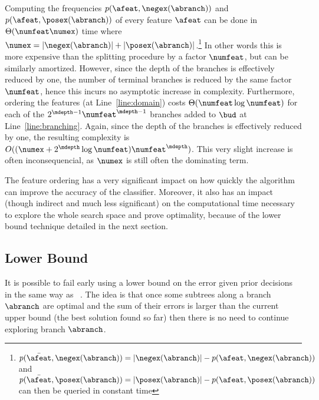 \documentclass{llncs}
\begin{document}


Computing the frequencies $p(\afeat,{\negex(\abranch)})$ and $p(\afeat,{\posex(\abranch)})$ of every feature $\afeat$ can be done in  $\Theta(\numfeat\numex)$ time where 
$\numex = |\negex(\abranch)|+|\posex(\abranch)|$.\footnote{$p(\bar{\afeat},{\negex(\abranch)}) = |\negex(\abranch)| - p({\afeat},{\negex(\abranch)})$ and $p(\bar{\afeat},{\posex(\abranch)}) = |\posex(\abranch)| - p({\afeat},{\posex(\abranch)})$ can then be queried in constant time} In other words this is more expensive than the splitting procedure by a factor $\numfeat$, but can be similarly amortized. However, since the depth of the branches is effectively reduced by one, the number of terminal branches is reduced by the same factor $\numfeat$, hence this incurs no asymptotic increase in complexity.
Furthermore, ordering the features (at Line~\ref{line:domain})
costs $\Theta(\numfeat \log \numfeat)$ for each of the $2^{\mdepth-1}\numfeat^{\mdepth-1}$ branches added to $\bud$ at Line~\ref{line:branching}. Again, since the depth of the branches is effectively reduced by one, the resulting complexity 
is $O((\numex + 2^{\mdepth} \log \numfeat) \numfeat^{\mdepth})$. This very slight increase is often inconsequencial, as 
$\numex$ is still often the dominating term.

The feature ordering has a very significant impact on how quickly the algorithm can improve the accuracy of the classifier. Moreover, it also has an impact (though indirect and much less significant) on the computational time necessary to explore the whole search space and prove optimality, because of the lower bound technique detailed in the next section.


\subsection{Lower Bound}
\label{sec:lb}

It is possible to fail early using a lower bound on the error given prior decisions in the same way as \dleight~\cite{dl8}.
The idea is that once some subtrees along a branch $\abranch$ are optimal and the sum of their errors is larger than the current upper bound (the best solution found so far) then there is no need to continue exploring branch $\abranch$. 
\end{document}
